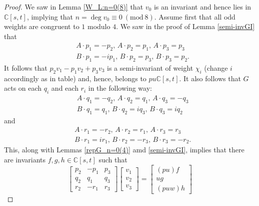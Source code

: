 \documentclass[10pt,a4paper]{amsart}
\begin{document}
\begin{proof}
    We saw in Lemma \ref{W_L:n=0(8)} that \(v_0\) is an invariant and hence lies in \(\mathbb{C}[s,t]\), implying that \(n = \deg v_0 \equiv 0 \ (\textrm{mod}\ 8)\). Assume first that all odd weights are congruent to \(1\) modulo \(4\). We saw in the proof of Lemma \ref{semi-invGI} that 
    \begin{align*}
        &A\cdot p_1 = -p_2,\, A\cdot p_2 = p_1,\, A\cdot p_3 = p_3 \\
        &B\cdot p_1 = -ip_1,\, B\cdot p_2 = p_3,\, B\cdot p_3 = p_2.
    \end{align*}
    It follows that \(p_2v_1 - p_1v_2 + p_3v_3\) is a semi-invariant of weight \(\chi_i\) (change \(i\) accordingly as in table) and, hence, belongs to \(pu\mathbb{C}[s,t]\). It also follows that \(G\) acts on each \(q_i\) and each \(r_i\) in the following way:
    \begin{align*}
        &A\cdot q_1 = -q_2,\, A\cdot q_2 = q_1,\, A\cdot q_3 = -q_3 \\
        &B\cdot q_1 = q_1,\, B\cdot q_2 = iq_3,\, B\cdot q_3 = iq_2 
    \end{align*}
    and
    \begin{align*}
        &A\cdot r_1 = -r_2,\, A\cdot r_2 = r_1,\, A\cdot r_3 = r_3 \\
        &B\cdot r_1 = ir_1,\, B\cdot r_2 = -r_3,\, B\cdot r_3 = -r_2. 
    \end{align*}
    This, along with Lemmas \ref{repG_n=0(4)} amd \ref{semi-invGI}, implies that there are invariants \(f, g, h \in \mathbb{C}[s,t]\) such that 
    \begin{equation*}
        \begin{bmatrix}
            p_2 & -p_1 & p_3 \\
            q_2 & q_1 & q_3 \\
            r_2 & -r_1 & r_3
        \end{bmatrix}
        \begin{bmatrix}
            v_1 \\
            v_2 \\
            v_3
        \end{bmatrix}
        =
        \begin{bmatrix}
            (pu)f \\
            ug \\
            (puw)h
        \end{bmatrix}
    \end{equation*}

\end{proof}
\end{document}
